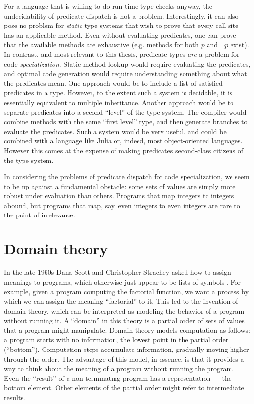 For a language that is willing to do run time type checks anyway, the
undecidability of predicate dispatch is not a problem.
Interestingly, it can also pose no problem for \emph{static} type systems
that wish to prove that every call site has an applicable method.
Even without evaluating predicates, one can prove that the available methods
are exhaustive (e.g. methods for both $p$ and $\neg p$ exist).
In contrast, and most relevant to this thesis, predicate types \emph{are} a
problem for code \emph{specialization}.
Static method lookup would require evaluating the predicates, and optimal code
generation would require understanding something about what the predicates mean.
One approach would be to include a list of satisfied predicates in a type.
However, to the extent such a system is decidable, it is essentially equivalent
to multiple inheritance.
Another approach would be to separate predicates into a second ``level'' of the
type system.
The compiler would combine methods with the same ``first level'' type, and then
generate branches to evaluate the predicates.
Such a system would be very useful, and could be
combined with a language like Julia or, indeed, most object-oriented
languages.
However this comes at the expense of making predicates second-class
citizens of the type system.

In considering the problems of predicate dispatch for code specialization,
we seem to be up against a fundamental obstacle: some sets of values are
simply more robust under evaluation than others.
Programs that map integers to integers abound, but programs that map, say,
even integers to even integers are rare to the point of irrelevance.


\section{Domain theory}

In the late 1960s Dana Scott and Christopher Strachey asked how to assign
meanings to programs, which otherwise just appear to be lists of symbols
\cite{scott1971toward}.
For example, given a program computing the factorial function, we
want a process by which we can assign the meaning ``factorial'' to it.
This led to the invention of domain theory, which can be interpreted
as modeling the behavior of a program without running it.
A ``domain'' in this theory is a
partial order of sets of values that a program might manipulate. 
Domain theory models computation as follows: a program starts with no
information, the lowest point in the partial order (``bottom'').
Computation steps accumulate information, gradually moving higher through
the order. The advantage of this model, in essence, is that it provides a
way to think about the meaning of a program without running the program.
Even the ``result'' of a non-terminating program has a representation ---
the bottom element. Other elements of the partial order might refer to
intermediate results.

